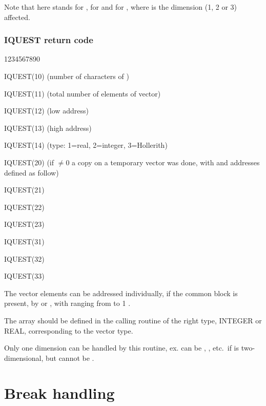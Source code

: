 Note that here  stands for ,
 for  and 
for , where  is the dimension (1, 2 or 3) affected.

\subsubsection*{IQUEST return code}

\begin{DLtt}{1234567890}
\item[IQUEST(10)]  (number of characters of )
\item[IQUEST(11)]  (total number of elements of vector)
\item[IQUEST(12)]   (low address)
\item[IQUEST(13)]  (high address)
\item[IQUEST(14)]  (type: 1=real, 2=integer, 3=Hollerith)
\item[IQUEST(20)]  (if $\neq 0$ a copy on a temporary vector was done,
                     with  and  addresses defined as follow)
\item[IQUEST(21)] 
\item[IQUEST(22)] 
\item[IQUEST(23)] 
\item[IQUEST(31)] 
\item[IQUEST(32)] 
\item[IQUEST(33)] 
\end{DLtt}

The vector elements can be addressed individually, if the common block 
is present, by  or , with  ranging from 
 to 1 .

The array  should be defined in the calling routine of the right type,
INTEGER or REAL, corresponding to the vector type.

Only one dimension can be handled by this routine, ex.  can be
, , etc.\ if  is two-dimensional,
but cannot be .
\section{Break handling}

